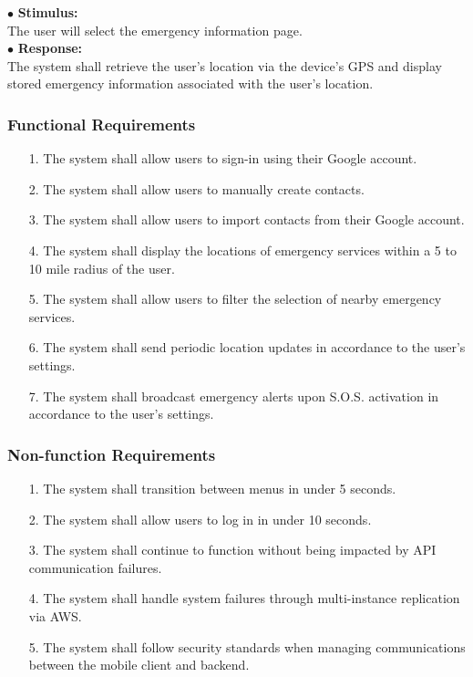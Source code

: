 \documentclass{scrreprt}
\begin{document}
\vspace{4mm}
	\hspace{-4.75mm} $\bullet$ \textbf{Stimulus:} \\ \hspace{5mm} The user will select the emergency information page.\\
	$\bullet$ \textbf{Response:} \\ \hspace{5mm} The system shall retrieve the user's location via the device's GPS and display stored emergency information associated with the user's location.


\subsubsection{Functional Requirements}
\begin{enumerate}
	\item[1.] The system shall allow users to sign-in using their Google account.
	\item[2.] The system shall allow users to manually create contacts.
	\item[3.] The system shall allow users to import contacts from their Google account.
	\item[4.] The system shall display the locations of emergency services within a 5 to 10 mile radius of the user.
	\item[5.] The system shall allow users to filter the selection of nearby emergency services.
	\item[6.] The system shall send periodic location updates in accordance to the user's settings.
	\item[7.] The system shall broadcast emergency alerts upon S.O.S. activation in accordance to the user's settings.
\end{enumerate}


\subsubsection{Non-function Requirements}
\begin{enumerate}
	\item[1.] The system shall transition between menus in under 5 seconds.
	\item[2.] The system shall allow users to log in in under 10 seconds.
	\item[3.] The system shall continue to function without being impacted by API communication failures.
	\item[4.] The system shall handle system failures through multi-instance replication via AWS.
	\item[5.] The system shall follow security standards when managing communications between the mobile client and backend.
\end{enumerate}
\end{document}
